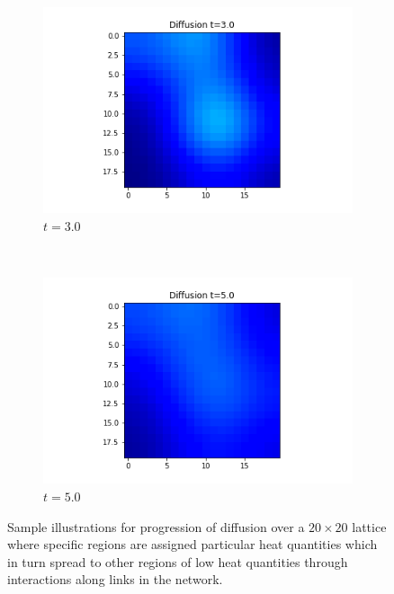 \documentclass[10pt,a4paper]{article}
\begin{document}
\begin{enumerate}[i)]
\begin{figure}[!h]
\begin{subfigure}[b]{0.25\textwidth}
         			\includegraphics[width= \textwidth]{images/grid-t3-x0.png}
         			\caption{$t=3.0$}
         			\label{gridt3x0}
         		\end{subfigure}~
         		\begin{subfigure}[b]{0.25\textwidth}
         			\includegraphics[width= \textwidth]{images/grid-t5-x0.png}
         			\caption{$t=5.0$}
         			\label{gridt5x0}
         		\end{subfigure}
         		\caption{Sample illustrations for progression of diffusion over a $20 \times 20$ lattice where specific regions are assigned particular heat quantities which in turn spread to other regions of low heat quantities through interactions along links in the network.}
         		\label{gridx0}
         	\end{figure}
         
            
         	

\end{enumerate}
\end{document}
